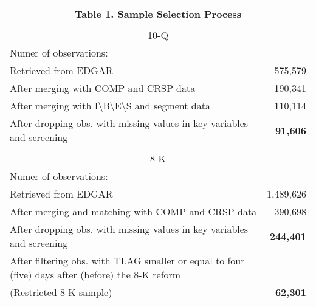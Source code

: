\begin{table}[htbp] \label{T1}
  \centering
    \begin{tabular}{lr}
    \multicolumn{2}{c}{\textbf{Table 1. Sample Selection Process}} \\
    \\
    \multicolumn{2}{c}{10-Q} \\
    Numer of observations: &  \\
    Retrieved from EDGAR & 575,579 \\
    After merging with COMP and CRSP data & 190,341 \\
    After merging with I\textbackslash{}B\textbackslash{}E\textbackslash{}S and segment data & 110,114 \\
    After dropping obs. with missing values in key variables and screening & \textbf{91,606} \\
      &  \\
    \multicolumn{2}{c}{8-K} \\
    Numer of observations: &  \\
    Retrieved from EDGAR & 1,489,626 \\
    After merging and matching with COMP and CRSP data & 390,698 \\
    After dropping obs. with missing values in key variables and screening & \textbf{244,401} \\
    After filtering obs. with TLAG smaller or equal to four (five) days after (before) the 8-K reform & \\
    (Restricted 8-K sample) & \textbf{62,301} 
    \end{tabular}%
\end{table}%
